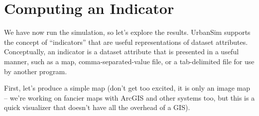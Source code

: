 \documentclass{howto}
\begin{document}
\section*{Computing an Indicator}

We have now run the simulation, so let's explore the results.
UrbanSim supports the concept of ``indicators'' that are useful
representations of dataset attributes.  Conceptually, an indicator
is a dataset attribute that is presented in a useful manner, such as
a map, comma-separated-value file, or a tab-delimited file for use by
another program.

First, let's produce a simple map (don't get too excited, it is only
an image map -- we're working on fancier maps with ArcGIS and other
systems too, but this is a quick visualizer that doesn't have all
the overhead of a GIS).
\end{document}
